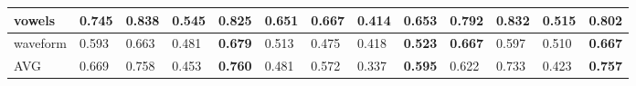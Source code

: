 \begin{table}[]
{\begin{tabular}{|l|llll|llllllll|}
vowels            & \multicolumn{1}{l|}{0.745}          & \multicolumn{1}{l|}{0.838}          & \multicolumn{1}{l|}{0.545}  & \textbf{0.825} & \multicolumn{1}{l|}{0.651}          & \multicolumn{1}{l|}{\textbf{0.667}} & \multicolumn{1}{l|}{0.414}  & \multicolumn{1}{l|}{0.653}          & \multicolumn{1}{l|}{0.792}          & \multicolumn{1}{l|}{\textbf{0.832}} & \multicolumn{1}{l|}{0.515}  & 0.802          \\ \hline
waveform          & \multicolumn{1}{l|}{0.593}          & \multicolumn{1}{l|}{0.663}          & \multicolumn{1}{l|}{0.481}  & \textbf{0.679} & \multicolumn{1}{l|}{0.513}          & \multicolumn{1}{l|}{0.475}          & \multicolumn{1}{l|}{0.418}  & \multicolumn{1}{l|}{\textbf{0.523}} & \multicolumn{1}{l|}{\textbf{0.667}} & \multicolumn{1}{l|}{0.597}          & \multicolumn{1}{l|}{0.510}  & \textbf{0.667} \\ \hline
AVG               & \multicolumn{1}{l|}{0.669}          & \multicolumn{1}{l|}{0.758}          & \multicolumn{1}{l|}{0.453}  & \textbf{0.760} & \multicolumn{1}{l|}{0.481}          & \multicolumn{1}{l|}{0.572}          & \multicolumn{1}{l|}{0.337}  & \multicolumn{1}{l|}{\textbf{0.595}} & \multicolumn{1}{l|}{0.622}          & \multicolumn{1}{l|}{0.733}          & \multicolumn{1}{l|}{0.423}  & \textbf{0.757} \\ \hline
\end{tabular}%
}
\end{table}


